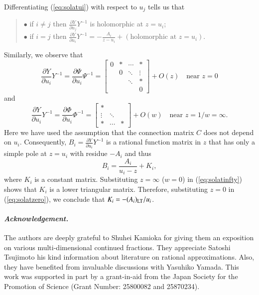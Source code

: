 \documentclass[12pt]{article}
\numberwithin{equation}{section}
\begin{document}
Differentiating (\ref{eq:solatui}) 
with respect to $u_j$ tells us that
\begin{quote}
$\bullet$ if $i \neq j$ then
$\displaystyle\frac{\partial Y}{\partial u_j} Y^{-1}$ is holomorphic at
$z=u_i$;
\\
$\bullet$ if $i=j$ then 
$\displaystyle
 \frac{\partial Y}{\partial u_i} Y^{-1}=
- \frac{A_i}{z-u_i}
+(\text{holomorphic at $z=u_i$}).$
\end{quote}
Similarly, we observe that
\begin{equation}
\label{eq:solatzero}
 \frac{\partial Y}{\partial u_i} Y^{-1}=\frac{\partial \Psi}{\partial u_i} \Psi^{-1}
 = 
 \begin{bmatrix}
 0 & * & \cdots & * \\
    & 0 & \ddots & \vdots \\
    &    &  \ddots & * \\
    &    &             & 0
 \end{bmatrix} +O(z)
 \quad \text{near $z=0$}
\end{equation}
and
\begin{equation}
\label{eq:solatinfty}
 \frac{\partial Y}{\partial u_i} Y^{-1}=\frac{\partial \Phi}{\partial u_i} \Phi^{-1}
 = 
 \begin{bmatrix}
 * &  & \\
 \vdots   & \ddots &  \\
*    &  \cdots  &   * 
 \end{bmatrix} +O(w)
 \quad \text{near $z=1/w=\infty$}.
\end{equation}
Here we have used the assumption that
the connection matrix $C$ does not depend on $u_i$.
Consequently, 
$\displaystyle B_i= \frac{\partial Y}{\partial u_i} Y^{-1}$
is a rational function matrix in $z$
that has only a simple pole at $z=u_i$ with
residue $-A_i$
and
thus
\[
B_i= \frac{A_i}{u_i-z}+K_i,
\]
where
$K_i$ is a constant matrix.
Substituting $z=\infty$ ($w=0$)
in (\ref{eq:solatinfty}) shows that $K_i$ is a lower triangular matrix. 
Therefore, substituting $z=0$ in (\ref{eq:solatzero}),
we  conclude that
$K_i=- (A_i)_{\rm LT}/u_i$.






\small
\paragraph{\it Acknowledgement.}
The authors are deeply grateful to
Shuhei Kamioka  
for giving them an exposition on various multi-dimensional continued fractions.
They appreciate Satoshi Tsujimoto 
his kind information about literature on rational approximations.
Also, they have benefited from invaluable discussions with Yasuhiko Yamada.
This work was supported
in part by a grant-in-aid from the Japan Society for the Promotion of Science (Grant Number: 25800082 and 25870234).
\end{document}
